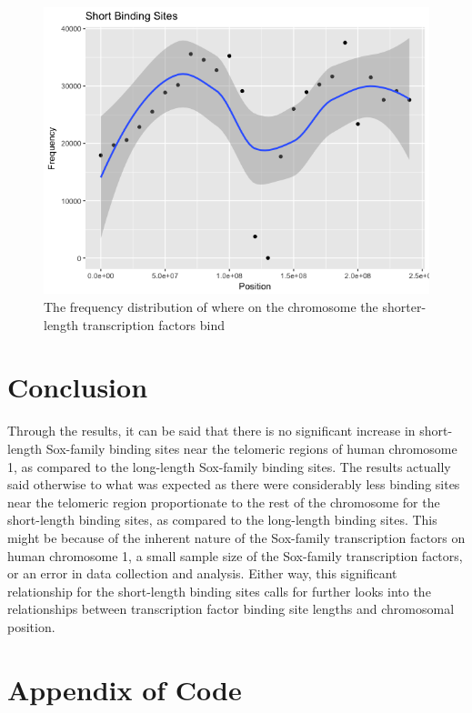 \documentclass[12pt, a4paper]{article}
\begin{document}
\begin{figure}[H]
\caption{The frequency distribution of where on the chromosome the shorter-length transcription factors bind}
\centering
\includegraphics[width=\textwidth]{shortbsplot.png}
\end{figure}
\section{Conclusion}
Through the results, it can be said that there is no significant increase in short-length Sox-family binding sites near the telomeric regions of human chromosome 1, as compared to the long-length Sox-family binding sites. The results actually said otherwise to what was expected as there were considerably less binding sites near the telomeric region proportionate to the rest of the chromosome for the short-length binding sites, as compared to the long-length binding sites. This might be because of the inherent nature of the Sox-family transcription factors on human chromosome 1, a small sample size of the Sox-family transcription factors, or an error in data collection and analysis. Either way, this significant relationship for the short-length binding sites calls for further looks into the relationships between transcription factor binding site lengths and chromosomal position.
\section{Appendix of Code}
\end{document}
